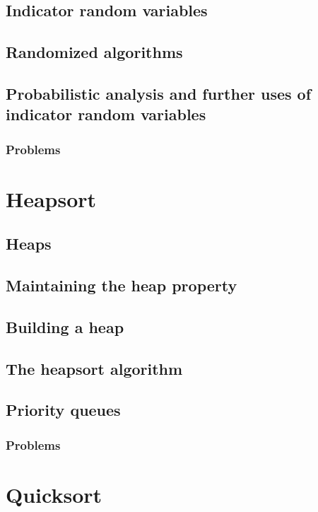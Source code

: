 \documentclass[fontsize=12pt,paper=a4,open=any]{book}
\begin{document}
\section{Indicator random variables}

\section{Randomized algorithms}

\section{Probabilistic analysis and further uses of indicator random variables}

\subsection*{Problems}


\chapter{Heapsort}

\section{Heaps}

\section{Maintaining the heap property}

\section{Building a heap}

\section{The heapsort algorithm}

\section{Priority queues}

\subsection*{Problems}


\chapter{Quicksort}
\end{document}
